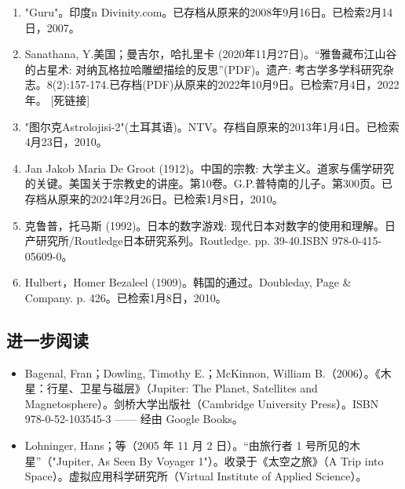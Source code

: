 \begin{enumerate}
\item "Guru"。印度n Divinity.com。已存档从原来的2008年9月16日。已检索2月14日，2007。
\item Sanathana, Y.美国；曼吉尔，哈扎里卡 (2020年11月27日)。“雅鲁藏布江山谷的占星术: 对纳瓦格拉哈雕塑描绘的反思”(PDF)。遗产: 考古学多学科研究杂志。8(2):157-174.已存档(PDF)从原来的2022年10月9日。已检索7月4日，2022年。 [死链接]
\item "图尔克Astrolojisi-2"(土耳其语)。NTV。存档自原来的2013年1月4日。已检索4月23日，2010。
\item Jan Jakob Maria De Groot (1912)。中国的宗教: 大学主义。道家与儒学研究的关键。美国关于宗教史的讲座。第10卷。G.P.普特南的儿子。第300页。已存档从原来的2024年2月26日。已检索1月8日，2010。
\item 克鲁普，托马斯 (1992)。日本的数字游戏: 现代日本对数字的使用和理解。日产研究所/Routledge日本研究系列。Routledge. pp. 39-40.ISBN 978-0-415-05609-0。
\item Hulbert，Homer Bezaleel (1909)。韩国的通过。Doubleday, Page & Company. p. 426。已检索1月8日，2010。
\end{enumerate}
\subsection{进一步阅读}
\begin{itemize}
\item Bagenal, Fran；Dowling, Timothy E.；McKinnon, William B.（2006）。《木星：行星、卫星与磁层》（Jupiter: The Planet, Satellites and Magnetosphere）。剑桥大学出版社（Cambridge University Press）。ISBN 978-0-52-103545-3 —— 经由 Google Books。
\item Lohninger, Hans；等（2005 年 11 月 2 日）。“由旅行者 1 号所见的木星”（"Jupiter, As Seen By Voyager 1"）。收录于《太空之旅》（A Trip into Space）。虚拟应用科学研究所（Virtual Institute of Applied Science）。
\end{itemize}
